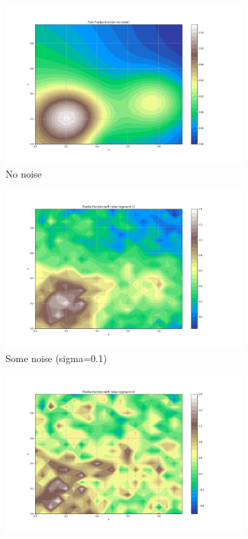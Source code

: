 \documentclass{article}
\begin{document}
\begin{figure}[h!]
    \centering
    \begin{subfigure}{0.6\linewidth}
        \includegraphics[width=\linewidth]{figures/1_franke_contour_no_noise.png}
        \caption{No noise}
    \end{subfigure}
    \begin{subfigure}{0.6\linewidth}
        \includegraphics[width=\linewidth]{figures/1_franke_contour_some_noise.png}
        \caption{Some noise (sigma=0.1)}
    \end{subfigure}
    \begin{subfigure}{0.6\linewidth}
        \includegraphics[width=\linewidth]{figures/1_franke_contour_noisy.png}

\end{subfigure}
\end{figure}
\end{document}
